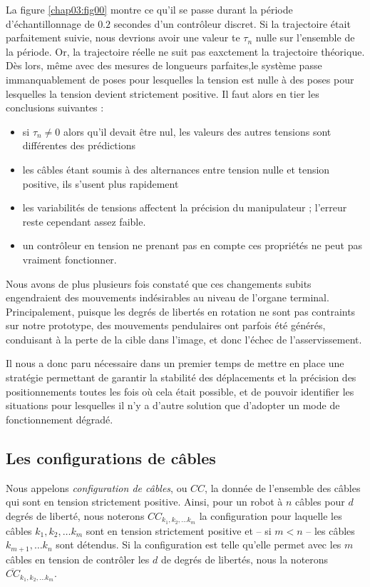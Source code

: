 La figure \ref{chap03:fig00} montre ce qu'il se passe durant la période 
d'échantillonnage de $0.2$ secondes d'un contrôleur discret. Si la trajectoire 
était parfaitement suivie, nous devrions avoir une valeur te $\tau_n$ nulle sur 
l'ensemble de la période. Or, la trajectoire réelle ne suit pas eaxctement la 
trajectoire théorique. Dès lors, même avec des mesures de longueurs parfaites,le 
système passe immanquablement de poses pour lesquelles la tension est nulle à 
des poses pour lesquelles la tension devient strictement positive. Il faut alors 
en tier les conclusions suivantes :
\begin{itemize}
 \item si $\tau_n \neq 0$ alors qu'il devait être nul, les valeurs des autres 
tensions sont différentes des prédictions 
  \item les câbles étant soumis à des 
alternances entre tension nulle et tension positive, ils s'usent plus rapidement
 \item les variabilités de tensions affectent la précision du manipulateur 
; l'erreur reste cependant assez faible.
 \item un contrôleur en tension ne prenant pas en compte ces propriétés ne peut 
pas vraiment fonctionner.
\end{itemize}

Nous avons de plus plusieurs fois constat\'e que ces changements subits engendraient des
mouvements ind\'esirables au niveau de l'organe terminal. Principalement,
puisque les degr\'es de libert\'es en rotation ne sont pas contraints sur notre
prototype, des mouvements pendulaires ont parfois \'et\'e g\'en\'er\'es,
conduisant \`a la perte de la cible dans l'image, et donc l'\'echec de
l'asservissement.

Il nous a donc paru n\'ecessaire dans un premier temps de mettre en place une
strat\'egie permettant de garantir la stabilit\'e des d\'eplacements et la
pr\'ecision des positionnements toutes les fois o\`u cela \'etait possible, et
de pouvoir identifier les situations pour lesquelles il n'y a d'autre solution
que d'adopter un mode de fonctionnement d\'egrad\'e.

\subsection{Les configurations de c\^ables}

Nous appelons {\it configuration de c\^ables}, ou $CC$, la donn\'ee de
l'ensemble des c\^ables qui sont en tension strictement positive. Ainsi, pour
un robot \`a $n$ c\^ables pour $d$ degr\'es de libert\'e, nous noterons
$CC_{k_1, k_2, \dots k_m}$ la configuration pour laquelle les c\^ables $k_1,
k_2, \dots k_m$ sont en tension strictement positive et -- si $m < n$ --  les
c\^ables $k_{m+1}, \dots k_n$ sont d\'etendus. Si la configuration est telle
qu'elle permet avec les $m$ c\^ables en tension de contr\^oler les $d$ de
degr\'es de libert\'es, nous la noterons $\overline{CC}_{k_1, k_2, \dots k_m}$.

